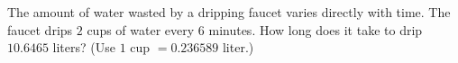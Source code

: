 The amount of water wasted by a dripping faucet varies directly with time. The faucet drips $2$ cups of water every $6$ minutes. How long does it take to drip $10.6465$ liters? (Use $1$ cup $=0.236589$ liter.)
